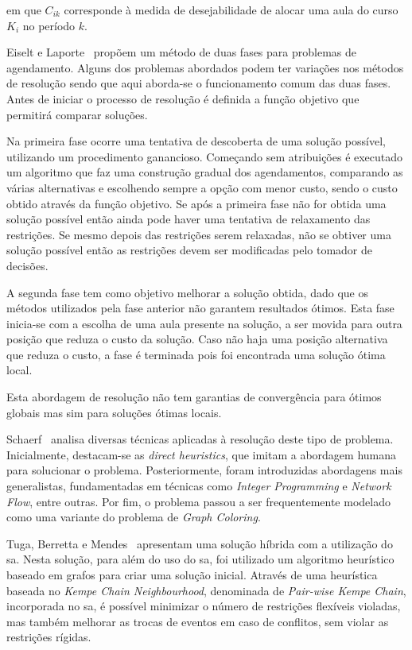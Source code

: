 em que $C_{ik}$ corresponde à medida de desejabilidade de alocar uma aula do curso $K_{i}$ no período $k$.

Eiselt e Laporte~\cite{CombinatorialOptimizationProblems-Eiselt-1987} propõem um método de duas fases para problemas de agendamento. Alguns dos problemas abordados podem ter variações nos métodos de resolução sendo que aqui aborda-se o funcionamento comum das duas fases. Antes de iniciar o processo de resolução é definida a função objetivo que permitirá comparar soluções.

Na primeira fase ocorre uma tentativa de descoberta de uma solução possível, utilizando um procedimento ganancioso. Começando sem atribuições é executado um algoritmo que faz uma construção gradual dos agendamentos, comparando as várias alternativas e escolhendo sempre a opção com menor custo, sendo o custo obtido através da função objetivo. Se após a primeira fase não for obtida uma solução possível então ainda pode haver uma tentativa de relaxamento das restrições. Se mesmo depois das restrições serem relaxadas, não se obtiver uma solução possível então as restrições devem ser modificadas pelo tomador de decisões.

A segunda fase tem como objetivo melhorar a solução obtida, dado que os métodos utilizados pela fase anterior não garantem resultados ótimos. Esta fase inicia-se com a escolha de uma aula presente na solução, a ser movida para outra posição que reduza o custo da solução. Caso não haja uma posição alternativa que reduza o custo, a fase é terminada pois foi encontrada uma solução ótima local.

Esta abordagem de resolução não tem garantias de convergência para ótimos globais mas sim para soluções ótimas locais. 

Schaerf~\cite{SurveyAutomatedTimetabling-Schaerf-1999} analisa diversas técnicas aplicadas à resolução deste tipo de problema. Inicialmente, destacam-se as \textit{direct heuristics}, que imitam a abordagem humana para solucionar o problema. Posteriormente, foram introduzidas abordagens mais generalistas, fundamentadas em técnicas como \textit{Integer Programming} e \textit{Network Flow}, entre outras. Por fim, o problema passou a ser frequentemente modelado como uma variante do problema de \textit{Graph Coloring}.

Tuga, Berretta e Mendes~\cite{HybridSimulatedAnnealing-Tuga-2007} apresentam uma solução híbrida com a utilização do \gls{sa}. Nesta solução, para além do uso do \gls{sa}, foi utilizado um algoritmo heurístico baseado em grafos para criar uma solução inicial. Através de uma heurística baseada no \textit{Kempe Chain Neighbourhood}, denominada de \textit{Pair-wise Kempe Chain}, incorporada no \gls{sa}, é possível minimizar o número de restrições flexíveis violadas, mas também melhorar as trocas de eventos em caso de conflitos, sem violar as restrições rígidas.


